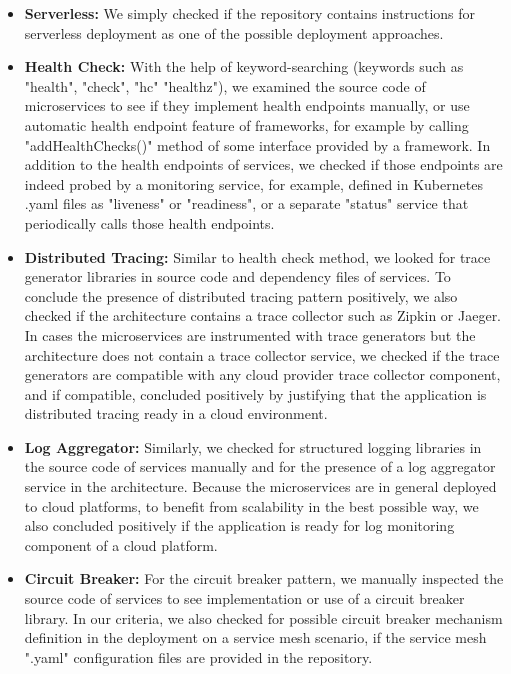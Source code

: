 \documentclass{Configuration_Files/PoliMi3i_thesis}
\begin{document}
\begin{itemize}
\begin{itemize}
        \item \textbf{Serverless:} We simply checked if the repository contains instructions for serverless deployment as one of the possible deployment approaches.
        
        \item \textbf{Health Check:} With the help of keyword-searching (keywords such as "health", "check", "hc" "healthz"), we examined the source code of microservices to see if they implement health endpoints manually, or use automatic health endpoint feature of frameworks, for example by calling "addHealthChecks()" method of some interface provided by a framework.
        In addition to the health endpoints of services, we checked if those endpoints are indeed probed by a monitoring service, for example, defined in Kubernetes .yaml files as "liveness" or "readiness", or a separate "status" service that periodically calls those health endpoints.
        
        \item \textbf{Distributed Tracing:} Similar to health check method, we looked for trace generator libraries in source code and dependency files of services.
        To conclude the presence of distributed tracing pattern positively, we also checked if the architecture contains a trace collector such as Zipkin or Jaeger.
        In cases the microservices are instrumented with trace generators but the architecture does not contain a trace collector service, we checked if the trace generators are compatible with any cloud provider trace collector component, and if compatible, concluded positively by justifying that the application is distributed tracing ready in a cloud environment.
        
        \item \textbf{Log Aggregator:} Similarly, we checked for structured logging libraries in the source code of services manually and for the presence of a log aggregator service in the architecture.
        Because the microservices are in general deployed to cloud platforms, to benefit from scalability in the best possible way, we also concluded positively if the application is ready for log monitoring component of a cloud platform.
        
        \item \textbf{Circuit Breaker:} For the circuit breaker pattern, we manually inspected the source code of services to see implementation or use of a circuit breaker library.
        In our criteria, we also checked for possible circuit breaker mechanism definition in the deployment on a service mesh scenario, if the service mesh ".yaml" configuration files are provided in the repository.
        

\end{itemize}
\end{itemize}
\end{document}
